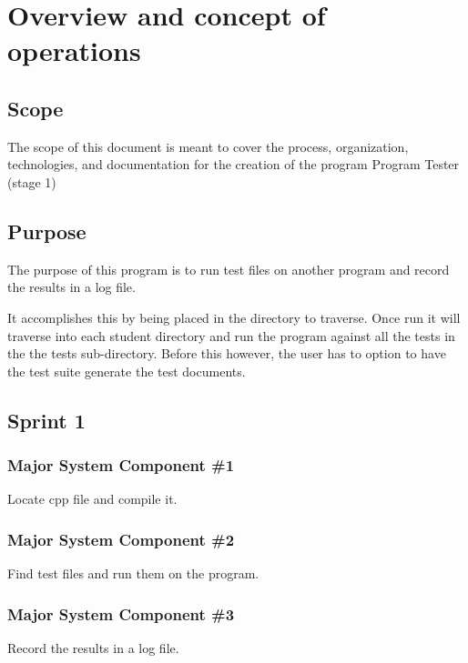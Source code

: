 
\chapter{Overview and concept of operations}



\section{Scope}
The scope of this document is meant to cover the process, organization,
technologies, and documentation for the creation of the program
Program Tester (stage 1)

\section{Purpose}
The purpose of this program is to run test files on another
 program and record the results in a log file.

It accomplishes this by being placed in the directory to traverse. Once run it will traverse into each student directory and run the program against all the tests in the the tests sub-directory. Before this however, the user has to option to have the test suite generate the test documents.

\section{Sprint 1}

\subsection{Major System Component \#1}
Locate cpp file and compile it.

\subsection{Major System Component \#2}
Find test files and run them on the program.

\subsection{Major System Component \#3}
Record the results in a log file.

